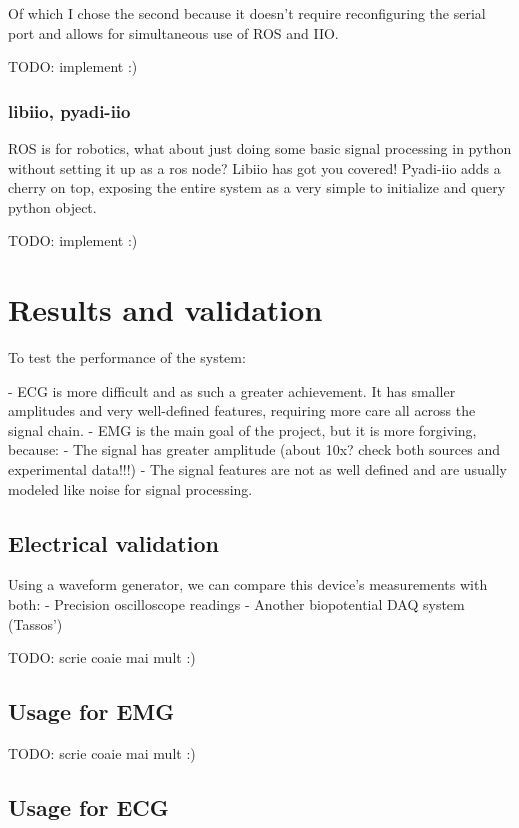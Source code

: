 \documentclass{thesis}
\newcommand{\todo}[1]{{\color{red}TODO: #1}}
\begin{document}
{Of which I chose the second because it doesn't require reconfiguring the serial port and allows for simultaneous use of ROS and IIO.

\todo{implement :)}

\subsubsection{libiio, pyadi-iio}

ROS is for robotics, what about just doing some basic signal processing in python without setting it up as a ros node? Libiio has got you covered! Pyadi-iio adds a cherry on top, exposing the entire system as a very simple to initialize and query python object.

\todo{implement :)}

\newpage
\section{Results and validation}

To test the performance of the system:

- ECG is more difficult and as such a greater achievement. It has smaller amplitudes and very well-defined features, requiring more care all across the signal chain. 
- EMG is the main goal of the project, but it is more forgiving, because:
    - The signal has greater amplitude (about 10x? check both sources and experimental data!!!)
    - The signal features are not as well defined and are usually modeled like noise for signal processing.

\subsection{Electrical validation}

Using a waveform generator, we can compare this device's measurements with both:
- Precision oscilloscope readings
- Another biopotential DAQ system (Tassos')

\todo{scrie coaie mai mult :)}

\subsection{Usage for EMG}

\todo{scrie coaie mai mult :)}

\subsection{Usage for ECG}

}
\end{document}
